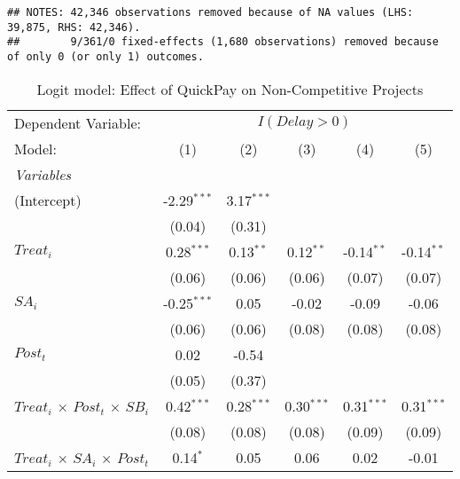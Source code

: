 \documentclass[
]{article}
\begin{document}
\begin{verbatim}
## NOTES: 42,346 observations removed because of NA values (LHS: 39,875, RHS: 42,346).
##        9/361/0 fixed-effects (1,680 observations) removed because of only 0 (or only 1) outcomes.
\end{verbatim}

\begin{table}[htbp]
   \centering
   \caption{Logit model: Effect of QuickPay on Non-Competitive Projects}
   \begin{tabular}{lccccc}
      \tabularnewline\midrule\midrule
      Dependent Variable: & \multicolumn{5}{c}{$I(Delay>0)$}\\
      Model:                                        & (1)           & (2)          & (3)          & (4)          & (5)\\
      \midrule \emph{Variables} &   &   &   &   &  \\
      (Intercept)                                   & -2.29$^{***}$ & 3.17$^{***}$ &              &              &   \\
                                                    & (0.04)        & (0.31)       &              &              &   \\
      $Treat_i$                                     & 0.28$^{***}$  & 0.13$^{**}$  & 0.12$^{**}$  & -0.14$^{**}$ & -0.14$^{**}$\\
                                                    & (0.06)        & (0.06)       & (0.06)       & (0.07)       & (0.07)\\
      $SA_i$                                        & -0.25$^{***}$ & 0.05         & -0.02        & -0.09        & -0.06\\
                                                    & (0.06)        & (0.06)       & (0.08)       & (0.08)       & (0.08)\\
      $Post_t$                                      & 0.02          & -0.54        &              &              &   \\
                                                    & (0.05)        & (0.37)       &              &              &   \\
      $Treat_i$ $\times$ $Post_t$ $\times$ $SB_i$ & 0.42$^{***}$  & 0.28$^{***}$ & 0.30$^{***}$ & 0.31$^{***}$ & 0.31$^{***}$\\
                                                    & (0.08)        & (0.08)       & (0.08)       & (0.09)       & (0.09)\\
      $Treat_i$ $\times$ $SA_i$ $\times$ $Post_t$ & 0.14$^{*}$    & 0.05         & 0.06         & 0.02         & -0.01\\

\end{tabular}
\end{table}
\end{document}
